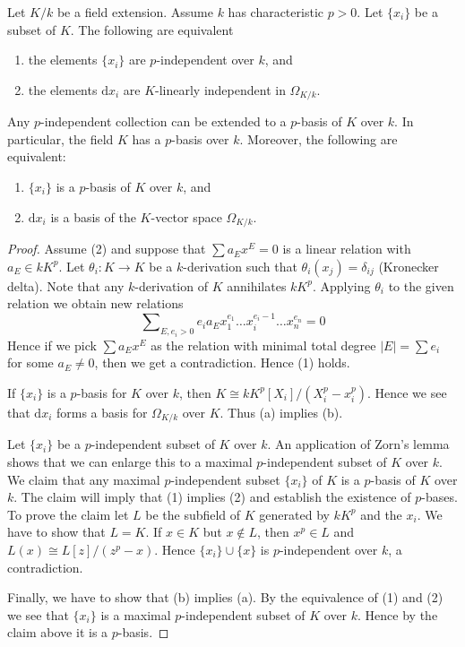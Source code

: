 \begin{lemma}
\label{lemma-p-basis}
Let $K/k$ be a field extension. Assume $k$ has characteristic
$p > 0$. Let $\{x_i\}$ be a subset of $K$. The following are equivalent
\begin{enumerate}
\item the elements $\{x_i\}$ are $p$-independent over $k$, and
\item the elements $\text{d}x_i$ are $K$-linearly independent
in $\Omega_{K/k}$.
\end{enumerate}
Any $p$-independent collection can be extended to a $p$-basis of $K$ over $k$.
In particular, the field $K$ has a $p$-basis over $k$.
Moreover, the following are equivalent:
\begin{enumerate}
\item[(a)] $\{x_i\}$ is a $p$-basis of $K$ over $k$, and
\item[(b)] $\text{d}x_i$ is a basis of the $K$-vector space $\Omega_{K/k}$.
\end{enumerate}
\end{lemma}

\begin{proof}
Assume (2) and suppose that $\sum a_E x^E = 0$ is a linear relation
with $a_E \in k K^p$. Let $\theta_i : K \to K$ be a $k$-derivation such that
$\theta_i(x_j) = \delta_{ij}$ (Kronecker delta). Note that any $k$-derivation
of $K$ annihilates $kK^p$. Applying $\theta_i$ to the given relation we
obtain new relations
$$
\sum\nolimits_{E, e_i > 0}
e_i a_E x_1^{e_1}\ldots x_i^{e_i - 1} \ldots x_n^{e_n} = 0
$$
Hence if we pick $\sum a_E x^E$ as the relation with minimal
total degree $|E| = \sum e_i$ for some $a_E \not = 0$, then we
get a contradiction. Hence (1) holds.

\medskip\noindent
If $\{x_i\}$ is a $p$-basis for $K$ over $k$, then
$K \cong kK^p[X_i]/(X_i^p - x_i^p)$. Hence we see that
$\text{d}x_i$ forms a basis for $\Omega_{K/k}$ over $K$.
Thus (a) implies (b).

\medskip\noindent
Let $\{x_i\}$ be a $p$-independent subset of $K$ over $k$. An application
of Zorn's lemma shows that we can enlarge this to a maximal $p$-independent
subset of $K$ over $k$. We claim that any maximal $p$-independent subset
$\{x_i\}$ of $K$ is a $p$-basis of $K$ over $k$. The claim will imply
that (1) implies (2) and establish the existence of $p$-bases.
To prove the claim let $L$ be the subfield of $K$ generated by
$kK^p$ and the $x_i$. We have to show that $L = K$. If $x \in K$
but $x \not \in L$, then $x^p \in L$ and $L(x) \cong L[z]/(z^p - x)$.
Hence $\{x_i\} \cup \{x\}$ is $p$-independent over $k$, a contradiction.

\medskip\noindent
Finally, we have to show that (b) implies (a). By the equivalence of (1)
and (2) we see that $\{x_i\}$ is a maximal $p$-independent subset
of $K$ over $k$. Hence by the claim above it is a $p$-basis.
\end{proof}
